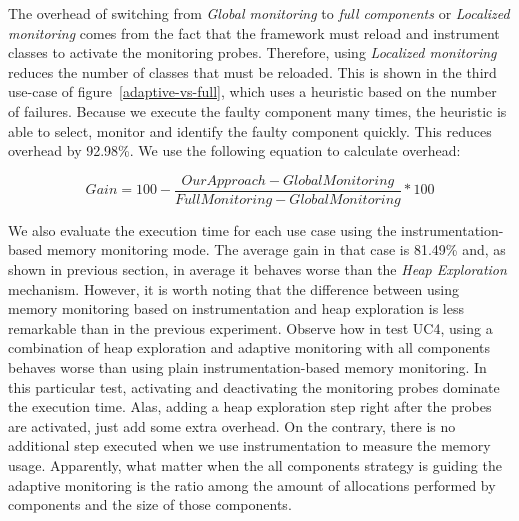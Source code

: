 The overhead of switching from \emph{Global monitoring} to \emph{full components} or \emph{Localized monitoring} comes from the fact that the framework must reload and instrument classes to activate the monitoring probes.
Therefore, using \emph{Localized monitoring} reduces the number of classes that must be reloaded.
This is shown in the third use-case of figure~\ref{adaptive-vs-full}, which uses a heuristic based on the number of failures.
Because we execute the faulty component many times, the heuristic is able to select, monitor and identify the faulty component quickly. This reduces overhead by 92.98\%. We use the following equation to calculate overhead:

\[ Gain=100-\frac{OurApproach-GlobalMonitoring}{FullMonitoring-GlobalMonitoring}*100 \]

We also evaluate the execution time for each use case using the instrumentation-based memory monitoring mode.
The average gain in that case is 81.49\% and, as shown in previous section, in average it behaves worse than the \textit{Heap Exploration} mechanism.
However, it is worth noting that the difference between using memory monitoring based on instrumentation and heap exploration is less remarkable than in the previous experiment.
Observe how in test UC4, using a combination of heap exploration and adaptive monitoring with all components behaves worse than using plain instrumentation-based memory monitoring.
In this particular test, activating and deactivating the monitoring probes dominate the execution time.
Alas, adding a heap exploration step right after the probes are activated, just add some extra overhead.
On the contrary, there is no additional step executed when we use instrumentation to measure the memory usage.
Apparently, what matter when the all components strategy is guiding the adaptive monitoring is the ratio among the amount of allocations performed by components and the size of those components.

